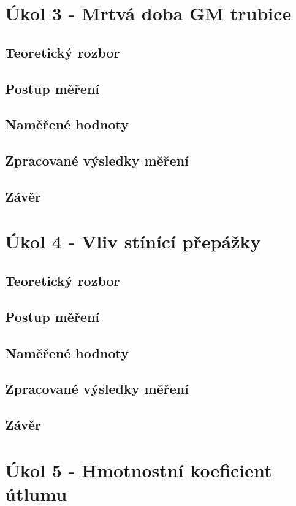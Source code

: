 \documentclass[fleqn]{protokol}
\begin{document}
\section{Úkol 3 - Mrtvá doba GM trubice}
    \subsection{Teoretický rozbor}
    \subsection{Postup měření}
    \subsection{Naměřené hodnoty}   
    \subsection{Zpracované výsledky měření}
    \subsection{Závěr}

\pagebreak

\section{Úkol 4 - Vliv stínící přepážky}
    \subsection{Teoretický rozbor}
    \subsection{Postup měření}
    \subsection{Naměřené hodnoty}   
    \subsection{Zpracované výsledky měření}
    \subsection{Závěr}

\pagebreak

\section{Úkol 5 - Hmotnostní koeficient útlumu}
\end{document}
